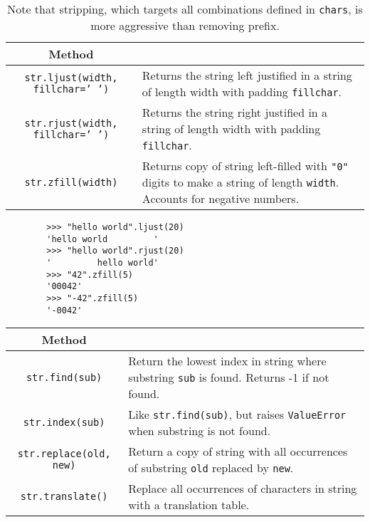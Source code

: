     \begin{definition}
      \begin{table}[H]
        \centering
        \begin{tabular}{|c|p{8cm}|}
          \hline
          \textbf{Method} & \textbf{} \\
          \hline
          \texttt{str.ljust(width, fillchar=' ')} & Returns the string left justified in a string of length width with padding \texttt{fillchar}. \\ 
          \texttt{str.rjust(width, fillchar=' ')} & Returns the string right justified in a string of length width with padding \texttt{fillchar}. \\  
          \texttt{str.zfill(width)} & Returns copy of string left-filled with \texttt{"0"} digits to make a string of length \texttt{width}. Accounts for negative numbers. \\ 
          \hline
        \end{tabular}
        \caption{Note that stripping, which targets all combinations defined in \texttt{chars}, is more aggressive than removing prefix. }
      \end{table}
      \begin{lstlisting} 
        >>> "hello world".ljust(20)
        'hello world         '
        >>> "hello world".rjust(20)
        '         hello world'
        >>> "42".zfill(5)
        '00042'
        >>> "-42".zfill(5)
        '-0042'
      \end{lstlisting}
    \end{definition} 

    \begin{definition}
      \begin{table}[H]
        \centering
        \begin{tabular}{|c|p{8cm}|}
          \hline
          \textbf{Method} & \textbf{} \\
          \hline
          \texttt{str.find(sub)} & Return the lowest index in string where substring \texttt{sub} is found. Returns -1 if not found. \\  
          \texttt{str.index(sub)} & Like \texttt{str.find(sub)}, but raises \texttt{ValueError} when substring is not found. \\ 
          \texttt{str.replace(old, new)} & Return a copy of string with all occurrences of substring \texttt{old} replaced by \texttt{new}. \\ 
          \texttt{str.translate()} & Replace all occurrences of characters in string with a translation table. \\ 
          \hline
        \end{tabular}
      \end{table}
    \end{definition}

